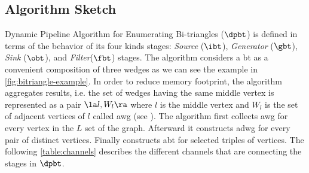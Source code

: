 \subsection{Algorithm Sketch}\label{sub:sec:algo-sketch}
Dynamic Pipeline Algorithm for Enumerating Bi-triangles ($\dpbt$) is defined in terms of the behavior of its four kinds stages: \textit{Source} ($\ibt$),  
\textit{Generator} ($\gbt$),  \textit{Sink} ($\obt$), and \textit{Filter}($\fbt$) stages. 
The algorithm considers a \acrlong{bt} as a convenient composition of three wedges as we can see the example in \autoref{fig:bitriangle-example}.
In order to reduce memory footprint, the algorithm aggregates results, i.e. the set of wedges having the same middle vertex is represented as a pair $\la l, W_l \ra$ where $l$ is the middle vertex and $W_l$ is the set of adjacent vertices of $l$ called \acrfull{awg} (see ).
The algorithm first collects \acrshort{awg} for every vertex in the $L$ set of the graph. Afterward it constructs \acrfull{adwg} for every pair of distinct vertices. Finally constructs \acrshort{abt}  for selected triples of vertices. 
The following \autoref{table:channels} describes the different channels that are connecting the stages in $\dpbt$.

